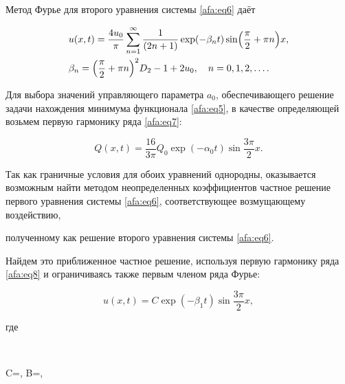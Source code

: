 Метод Фурье для второго уравнения системы \eqref{afa:eq6} даёт

\begin{equation}

\label{afa:eq8}

\begin{aligned}

&u(x,t)=\frac{4u_0 }{\pi }\sum\limits_{n=1}^\infty 

\frac{1}{(2n+1)} \exp({-\beta _n t})   \sin \Bigl(\frac{\pi }{2}+\pi n \Bigr) x,\\

&\beta_n =\Bigl(\frac{\pi }{2}+\pi n\Bigr)^2D_2 -1+2u_0,\quad n=0, 1, 2, \ldots.

\end{aligned}

\end{equation}



Для выбора значений управляющего параметра $a_0$, обеспечивающего решение задачи нахождения минимума функционала \eqref{afa:eq5}, в качестве определяющей возьмем первую гармонику ряда \eqref{afa:eq7}:

\begin{equation}

\label{afa:eq9}

Q( x, t)=\frac{16 }{3\pi } Q_0 \exp({-\alpha_0t})\sin \frac{3\pi }{2} x.

\end{equation}

Так как граничные условия для обоих уравнений однородны, оказывается возможным найти методом неопределенных коэффициентов частное решение первого уравнения системы \eqref{afa:eq6}, соответствующее возмущающему воздействию,

полученному как решение второго уравнения системы \eqref{afa:eq6}. 

Найдем это приближенное частное решение, используя первую гармонику ряда \eqref{afa:eq8} и ограничиваясь также первым членом ряда Фурье:

\begin{equation}

\label{afa:eq10}

u(x,t)=C \exp({-\beta _1 t})\sin \frac{3\pi }{2}x,

\end{equation}

где 

$$

C=, \quad B=,

